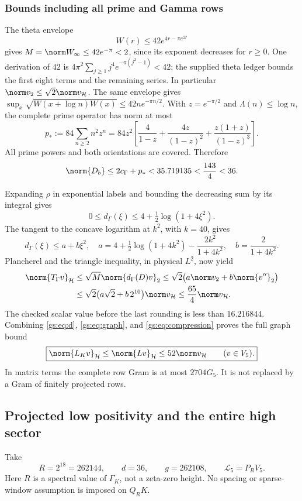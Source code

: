 \documentclass[11pt,a4paper]{article}
\numberwithin{equation}{section}
\theoremstyle{definition}\newtheorem{definition}[theorem]{Definition}
\theoremstyle{remark}\newtheorem{remark}[theorem]{Remark}
\newcommand{\Hh}{\mathcal H}\newcommand{\Hw}{\mathcal H}
\begin{document}
\subsubsection*{Bounds including all prime and Gamma rows}
The theta envelope
\[
 W(r)\le42e^{4r-\pi e^{2r}}
\]
gives $M=\norm W_\infty\le42e^{-\pi}<2$, since its exponent decreases
for $r\ge0$. One derivation of $42$ is
$4\pi^2\sum_{j\ge1}j^4e^{-\pi(j^2-1)}<42$; the supplied theta ledger
bounds the first eight terms and the remaining series.
In particular $\norm v_2\le\sqrt2\norm v_\Hh$.
The same envelope gives
$\sup_x\sqrt{W(x+\log n)W(x)}\le42n e^{-\pi n/2}$.
With $z=e^{-\pi/2}$ and $\Lambda(n)\le\log n$, the complete prime
operator has norm at most
\[
 p_*:=84\sum_{n\ge2}n^2z^n
 =84z^2\left[\frac4{1-z}+\frac{4z}{(1-z)^2}
                        +\frac{z(1+z)}{(1-z)^3}\right].
\]
All prime powers and both orientations are covered. Therefore
\begin{equation}\label{gs:eq:d}
 \norm{D_b}\le2c_\Gamma+p_*<35.719135<\frac{143}{4}<36.
\end{equation}

Expanding $\rho$ in exponential labels and bounding the decreasing sum
by its integral gives
\[
0\le d_\Gamma(\xi)\le4+\tfrac12\log(1+4\xi^2).
\]
The tangent to the concave logarithm at $k^2$, with $k=40$, gives
\[
 d_\Gamma(\xi)\le a+b\xi^2,\quad
 a=4+\tfrac12\log(1+4k^2)-\frac{2k^2}{1+4k^2},\quad
 b=\frac2{1+4k^2}.
\]
Plancherel and the triangle inequality, in physical $L^2$, now yield
\begin{align}
 \norm{T_\Gamma v}_\Hh
 &\le\sqrt M\norm{d_\Gamma(D)v}_2
 \le\sqrt2\bigl(a\norm v_2+b\norm{v''}_2\bigr)\notag\\
 &\le\sqrt2\bigl(a\sqrt2+b\,2^{10}\bigr)\norm v_\Hh
 \le\frac{65}{4}\norm v_\Hh.\label{gs:eq:graph}
\end{align}
The checked scalar value before the last rounding is less than
$16.216844$. Combining \eqref{gs:eq:d}, \eqref{gs:eq:graph}, and
\eqref{gs:eq:compression} proves the full graph bound
\begin{equation}\label{gs:eq:L}
 \boxed{\norm{L_Kv}_\Hh\le\norm{Lv}_\Hh
                   \le52\norm v_\Hh\qquad(v\in V_5).}
\end{equation}
In matrix terms the complete row Gram is at most $2704G_5$.
It is not replaced by a Gram of finitely projected rows.

\subsection{Projected low positivity and the entire high sector}
Take
\[
 R=2^{18}=262144,\qquad d=36,\qquad g=262108,
 \qquad\mathcal L_5=P_RV_5.
\]
Here $R$ is a spectral value of $\Gamma_K$, not a zeta-zero height.
No spacing or sparse-window assumption is imposed on $Q_RK$.
\end{document}
